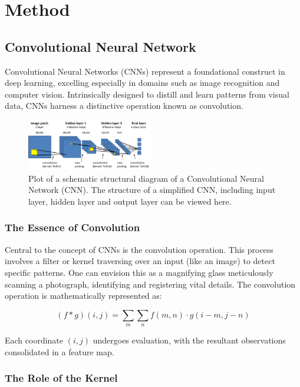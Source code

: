 \documentclass[10pt,twocolumn,letterpaper]{article}
\begin{document}
\section{Method} \label{sec:method}
\subsection{Convolutional Neural Network}

Convolutional Neural Networks (CNNs) represent a foundational construct in deep learning, excelling especially in domains such as image recognition and computer vision. Intrinsically designed to distill and learn patterns from visual data, CNNs harness a distinctive operation known as convolution.

\begin{figure}[htbp]
   \centering
   \includegraphics[width=0.49\textwidth]{Fig/1.png}
   \caption{Plot of a schematic structural diagram of a Convolutional Neural Network (CNN). The structure of a simplified CNN, including input layer, hidden layer and output layer can be viewed here.} \label{fig1}
\end{figure}

\subsubsection{The Essence of Convolution}

Central to the concept of CNNs is the convolution operation. This process involves a filter or kernel traversing over an input (like an image) to detect specific patterns. One can envision this as a magnifying glass meticulously scanning a photograph, identifying and registering vital details. The convolution operation is mathematically represented as:

\[ (f * g)(i, j) = \sum_{m} \sum_{n} f(m,n) \cdot g(i-m, j-n) \]

Each coordinate \( (i, j) \) undergoes evaluation, with the resultant observations consolidated in a feature map.

\subsubsection{The Role of the Kernel}
\end{document}
